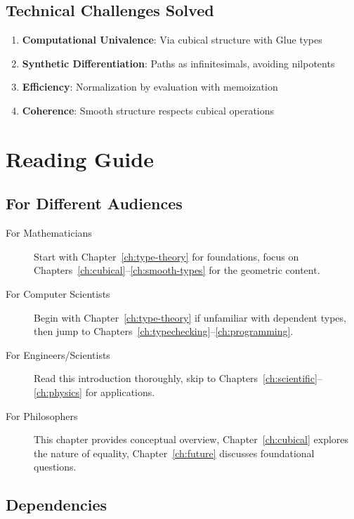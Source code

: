 \documentclass[12pt,openright,twoside]{book}
\theoremstyle{plain}
\theoremstyle{definition}
\theoremstyle{remark}
\begin{document}
\subsection{Technical Challenges Solved}

\begin{enumerate}
\item \textbf{Computational Univalence}: Via cubical structure with Glue types
\item \textbf{Synthetic Differentiation}: Paths as infinitesimals, avoiding nilpotents
\item \textbf{Efficiency}: Normalization by evaluation with memoization
\item \textbf{Coherence}: Smooth structure respects cubical operations
\end{enumerate}

\section{Reading Guide}
\label{sec:reading-guide}

\subsection{For Different Audiences}

\begin{description}
\item[For Mathematicians] Start with Chapter~\ref{ch:type-theory} for foundations, focus on Chapters~\ref{ch:cubical}–\ref{ch:smooth-types} for the geometric content.

\item[For Computer Scientists] Begin with Chapter~\ref{ch:type-theory} if unfamiliar with dependent types, then jump to Chapters~\ref{ch:typechecking}–\ref{ch:programming}.

\item[For Engineers/Scientists] Read this introduction thoroughly, skip to Chapters~\ref{ch:scientific}–\ref{ch:physics} for applications.

\item[For Philosophers] This chapter provides conceptual overview, Chapter~\ref{ch:cubical} explores the nature of equality, Chapter~\ref{ch:future} discusses foundational questions.
\end{description}

\subsection{Dependencies}
\end{document}
